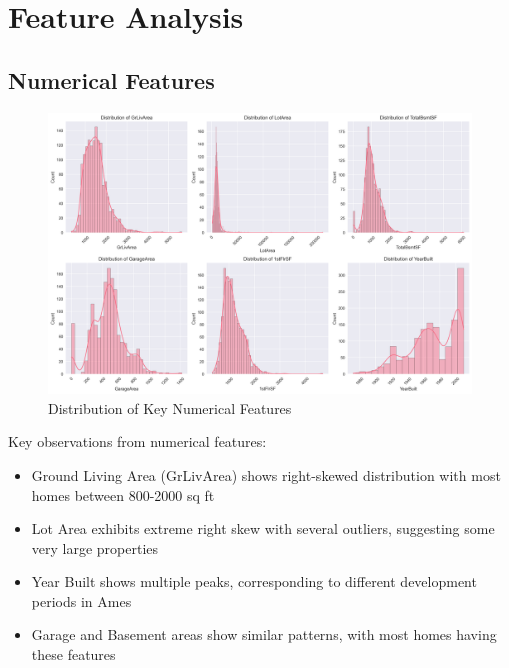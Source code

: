 \section{Feature Analysis}
\subsection{Numerical Features}
\begin{figure}[H]
    \centering
    \includegraphics[width=1.0\textwidth]{figures/numerical_features_dist.png}
    \caption{Distribution of Key Numerical Features}
    \label{fig:num_features_dist}
\end{figure}

Key observations from numerical features:
\begin{itemize}
    \item Ground Living Area (GrLivArea) shows right-skewed distribution with most homes between 800-2000 sq ft
    \item Lot Area exhibits extreme right skew with several outliers, suggesting some very large properties
    \item Year Built shows multiple peaks, corresponding to different development periods in Ames
    \item Garage and Basement areas show similar patterns, with most homes having these features
\end{itemize}

